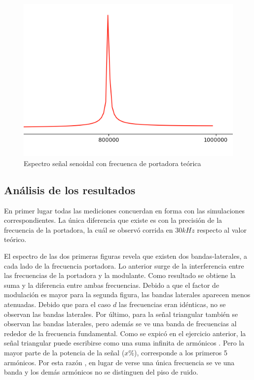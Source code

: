 \begin{figure}[H]
    \centering
    \includegraphics[scale=0.5]{Recursos/Ej3_senoidal_igualf_teorico.png}
    \caption{Espectro señal senoidal con frecuenca de portadora teórica}
\end{figure}

\subsection{An\'alisis de los resultados}

En primer lugar todas las mediciones concuerdan en forma con las simulaciones correspondientes. La única diferencia que existe es con la precisión de la frecuencia de la portadora, la cuál se observó corrida en $30kHz$ respecto al valor teórico.\newline

El espectro de las dos primeras figuras revela que existen dos bandas-laterales, a cada lado de la frecuencia portadora. Lo anterior surge de la interferencia entre las frecuencias de la portadora y la modulante. Como resultado se obtiene la suma y la diferencia entre ambas frecuencias. Debido a que el factor de modulaci\'on es mayor para la segunda figura, las bandas laterales aparecen menos atenuadas. Debido que para el caso $d$ las frecuencias eran id\'enticas, no se observan las bandas laterales. Por \'ultimo, para la señal triangular tambi\'en se observan las bandas laterales, pero adem\'as se ve una banda de frecuencias al rededor de la frecuencia fundamental. Como se expic\'o en el ejercicio anterior, la señal triangular puede escribirse como una suma infinita de arm\'onicos . Pero la mayor parte de la potencia de la señal ($x\%$), corresponde a los primeros 5 arm\'onicos. Por esta raz\'on , en lugar de verse una \'unica frecuencia se ve una banda y los dem\'as arm\'onicos no se distinguen del piso de ruido.




